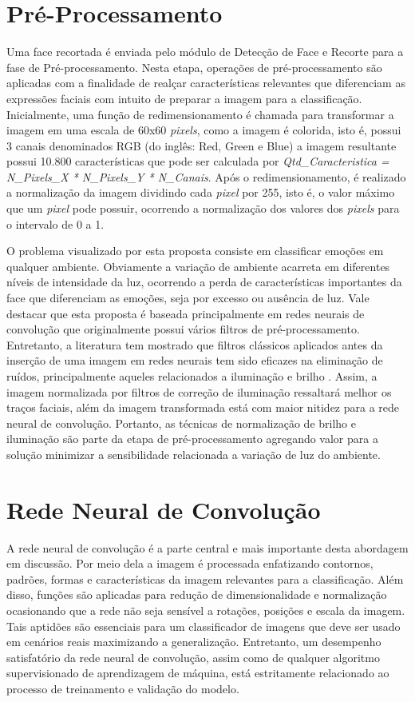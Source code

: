 \section{Pré-Processamento}\label{sec:preproc}
Uma face recortada é enviada pelo módulo de Detecção de Face e Recorte para a fase de Pré-processamento. Nesta etapa, operações de pré-processamento são aplicadas com a finalidade de realçar características relevantes que diferenciam as expressões faciais com intuito de preparar a imagem para a classificação. Inicialmente, uma função de redimensionamento é chamada para transformar a imagem em uma escala de 60x60 \textit{pixels}, como a imagem é colorida, isto é, possui 3 canais denominados RGB (do inglês: Red, Green e Blue) a imagem resultante possui 10.800 características que pode ser calculada por \textit{Qtd_Caracteristica = N_Pixels_X * N_Pixels_Y * N_Canais}. Após o redimensionamento, é realizado a normalização da imagem dividindo cada \textit{pixel} por 255, isto é, o valor máximo que um \textit{pixel} pode possuir, ocorrendo a normalização dos valores dos \textit{pixels} para o intervalo de 0 a 1. 

O problema visualizado por esta proposta consiste em classificar emoções em qualquer ambiente. Obviamente a variação de ambiente acarreta em diferentes níveis de intensidade da luz, ocorrendo a perda de características importantes da face que diferenciam as emoções, seja por excesso ou ausência de luz. Vale destacar que esta proposta é baseada principalmente em redes neurais de convolução que originalmente possui vários filtros de pré-processamento. Entretanto, a literatura tem mostrado que filtros clássicos aplicados antes da inserção de uma imagem em redes neurais tem sido eficazes na eliminação de ruídos, principalmente aqueles relacionados a iluminação e brilho \citep{art2,art4,art6}. Assim, a imagem normalizada por filtros de correção de iluminação ressaltará melhor os traços faciais, além da imagem transformada está com maior nitidez para a rede neural de convolução. Portanto, as técnicas de normalização de brilho e iluminação são parte da etapa de pré-processamento agregando valor para a solução minimizar a sensibilidade relacionada a variação de luz do ambiente.   


\section{Rede Neural de Convolução}\label{sec:redeneu}
A rede neural de convolução é a parte central e mais importante desta abordagem em discussão. Por meio dela a imagem é processada enfatizando contornos, padrões, formas e características da imagem relevantes para a classificação. Além disso, funções são aplicadas para redução de dimensionalidade e normalização ocasionando que a rede não seja sensível a rotações, posições e escala da imagem. Tais aptidões são essenciais para um classificador de imagens que deve ser usado em cenários reais maximizando a generalização. Entretanto, um desempenho satisfatório da rede neural de convolução, assim como de qualquer algoritmo supervisionado de aprendizagem de máquina, está estritamente relacionado ao processo de treinamento e validação do modelo.    

